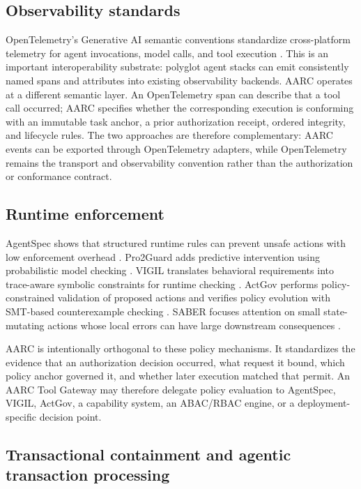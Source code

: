 \documentclass{article}
\begin{document}
\subsection{Observability standards}

OpenTelemetry's Generative AI semantic conventions standardize cross-platform
telemetry for agent invocations, model calls, and tool execution
\cite{opentelemetry2026genai}. This is an important interoperability substrate:
polyglot agent stacks can emit consistently named spans and attributes into
existing observability backends. AARC operates at a different semantic layer.
An OpenTelemetry span can describe that a tool call occurred; AARC specifies
whether the corresponding execution is conforming with an immutable task
anchor, a prior authorization receipt, ordered integrity, and lifecycle rules.
The two approaches are therefore complementary: AARC events can be exported
through OpenTelemetry adapters, while OpenTelemetry remains the transport and
observability convention rather than the authorization or conformance contract.

\subsection{Runtime enforcement}

AgentSpec shows that structured runtime rules can prevent unsafe actions with
low enforcement overhead \cite{wang2026agentspec}. Pro2Guard adds predictive
intervention using probabilistic model checking \cite{wang2025pro2guard}.
VIGIL translates behavioral requirements into trace-aware symbolic constraints
for runtime checking \cite{li2026vigil}. ActGov performs policy-constrained
validation of proposed actions and verifies policy evolution with SMT-based
counterexample checking \cite{zhang2026actgov}. SABER focuses attention on
small state-mutating actions whose local errors can have large downstream
consequences \cite{cuadron2026saber}.

AARC is intentionally orthogonal to these policy mechanisms. It standardizes
the evidence that an authorization decision occurred, what request it bound,
which policy anchor governed it, and whether later execution matched that
permit. An AARC Tool Gateway may therefore delegate policy evaluation to
AgentSpec, VIGIL, ActGov, a capability system, an ABAC/RBAC engine, or a
deployment-specific decision point.

\subsection{Transactional containment and agentic transaction processing}
\end{document}
